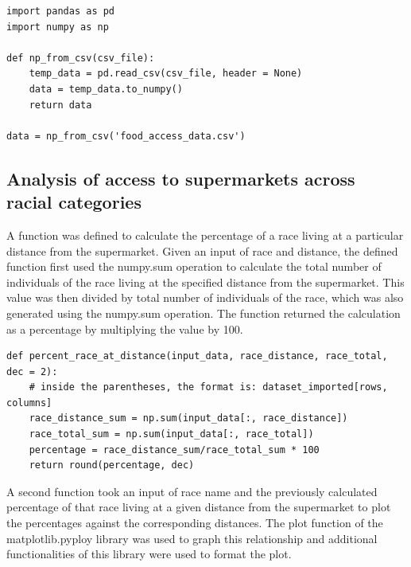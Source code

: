 \documentclass[letterpaper]{article} %
\begin{document}
\lstset{language=Python}
\begin{lstlisting}[frame=single]  
import pandas as pd
import numpy as np

def np_from_csv(csv_file):
    temp_data = pd.read_csv(csv_file, header = None)
    data = temp_data.to_numpy()
    return data

data = np_from_csv('food_access_data.csv')

\end{lstlisting}

\subsection{Analysis of access to supermarkets across racial categories}

A function was defined to calculate the percentage of a race living at a particular distance from the supermarket. Given an input of race and distance, the defined function first used the numpy.sum operation to calculate the total number of individuals of the race living at the specified distance from the supermarket. This value was then divided by total number of individuals of the race, which was also generated using the numpy.sum operation. The function returned the calculation as a percentage by multiplying the value by 100.
\vspace{0.25cm} %

\lstset{language=Python}
\begin{lstlisting}[frame=single] 
def percent_race_at_distance(input_data, race_distance, race_total, dec = 2):
    # inside the parentheses, the format is: dataset_imported[rows, columns]
    race_distance_sum = np.sum(input_data[:, race_distance])
    race_total_sum = np.sum(input_data[:, race_total])
    percentage = race_distance_sum/race_total_sum * 100
    return round(percentage, dec)

\end{lstlisting}

A second function took an input of race name and the previously calculated percentage of that race living at a given distance from the supermarket to plot the percentages against the corresponding distances. The plot function of the matplotlib.pyploy library was used to graph this relationship and additional functionalities of this library were used to format the plot.
\vspace{0.25cm}
\end{document}
